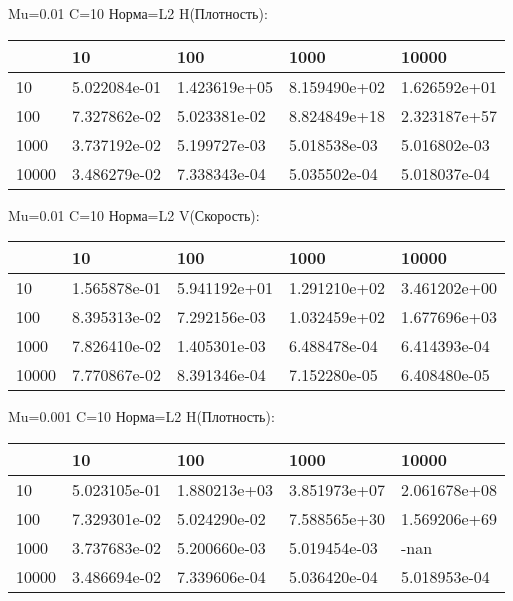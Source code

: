 \documentclass[a4paper, 12pt]{article}
\begin{document}
\bigskip
\bigskip
\bigskip


Mu=0.01  C=10 Норма=L2 H(Плотность):


\begin{tabular}{lllll}
\toprule
{} &         10    &         100   &         1000  &         10000 \\
\midrule
10    &  5.022084e-01 &  1.423619e+05 &  8.159490e+02 &  1.626592e+01 \\
100   &  7.327862e-02 &  5.023381e-02 &  8.824849e+18 &  2.323187e+57 \\
1000  &  3.737192e-02 &  5.199727e-03 &  5.018538e-03 &  5.016802e-03 \\
10000 &  3.486279e-02 &  7.338343e-04 &  5.035502e-04 &  5.018037e-04 \\
\bottomrule
\end{tabular}



\bigskip
\bigskip
\bigskip


Mu=0.01  C=10 Норма=L2 V(Скорость):


\begin{tabular}{lllll}
\toprule
{} &         10    &         100   &         1000  &         10000 \\
\midrule
10    &  1.565878e-01 &  5.941192e+01 &  1.291210e+02 &  3.461202e+00 \\
100   &  8.395313e-02 &  7.292156e-03 &  1.032459e+02 &  1.677696e+03 \\
1000  &  7.826410e-02 &  1.405301e-03 &  6.488478e-04 &  6.414393e-04 \\
10000 &  7.770867e-02 &  8.391346e-04 &  7.152280e-05 &  6.408480e-05 \\
\bottomrule
\end{tabular}



\bigskip
\bigskip
\bigskip


Mu=0.001  C=10 Норма=L2 H(Плотность):


\begin{tabular}{lllll}
\toprule
{} &         10    &         100   &         1000  &         10000 \\
\midrule
10    &  5.023105e-01 &  1.880213e+03 &  3.851973e+07 &  2.061678e+08 \\
100   &  7.329301e-02 &  5.024290e-02 &  7.588565e+30 &  1.569206e+69 \\
1000  &  3.737683e-02 &  5.200660e-03 &  5.019454e-03 &          -nan \\
10000 &  3.486694e-02 &  7.339606e-04 &  5.036420e-04 &  5.018953e-04 \\
\bottomrule
\end{tabular}
\end{document}
